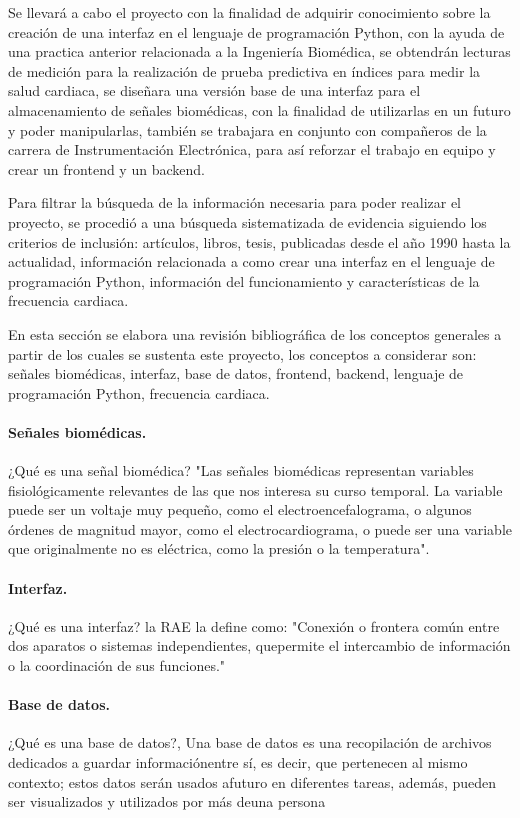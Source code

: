 \documentclass{article}
\begin{document}
		Se llevará a cabo el proyecto con la finalidad de adquirir conocimiento sobre la creación de una interfaz en el lenguaje de programación Python, con la ayuda de una practica anterior relacionada a la Ingeniería Biomédica, se obtendrán lecturas de medición para la realización de prueba predictiva en índices para medir la salud cardiaca, se diseñara una versión base de una interfaz para el almacenamiento de señales biomédicas, con la finalidad de utilizarlas en un futuro y poder manipularlas, también se trabajara en conjunto con compañeros de la carrera de Instrumentación Electrónica, para así reforzar el trabajo en equipo y crear un frontend y un backend. 
		
		Para filtrar la búsqueda de la información necesaria para poder realizar el proyecto, se procedió a una búsqueda sistematizada de evidencia siguiendo los criterios de inclusión: artículos, libros, tesis, publicadas desde el año 1990 hasta la actualidad, información relacionada a como crear una interfaz en el lenguaje de programación Python, información del funcionamiento y características de la frecuencia cardiaca. 
		
		En esta sección se elabora una revisión bibliográfica de los conceptos generales a partir de los cuales se sustenta este proyecto, los conceptos a considerar son: señales biomédicas, interfaz, base de datos, frontend, backend, lenguaje de programación Python, frecuencia cardiaca.
		
		\paragraph{Señales biomédicas.} ¿Qué es una señal biomédica? "Las señales biomédicas representan variables fisiológicamente relevantes de las que nos interesa su curso temporal. La variable puede ser un voltaje muy pequeño, como el electroencefalograma, o algunos órdenes de magnitud mayor, como el electrocardiograma, o puede ser una variable que originalmente no es eléctrica, como la presión o la temperatura"\cite{biomedica_s}. 
		\paragraph{Interfaz.} ¿Qué es una interfaz? la RAE la define como: "Conexión o frontera común entre dos aparatos o sistemas independientes, quepermite el intercambio de información o la coordinación de sus funciones." \cite{rae_interfaz}
		\paragraph{Base de datos.} ¿Qué es una base de datos?, Una base de datos es una recopilación de archivos dedicados a guardar informaciónentre sí, es decir, que pertenecen al mismo contexto; estos datos serán usados afuturo en diferentes tareas, además, pueden ser visualizados y utilizados por más deuna persona \cite{BaseDDatos}
\end{document}
